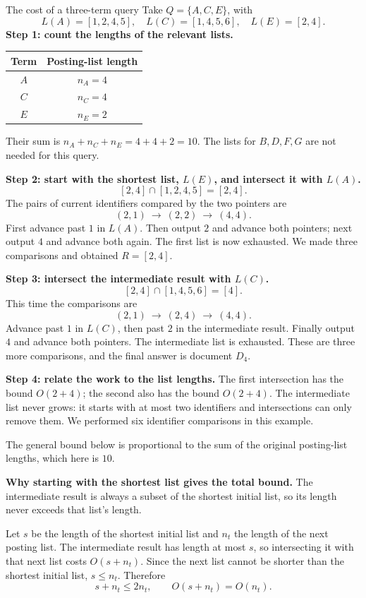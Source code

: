 \documentclass[a4paper,12pt,oneside]{report}
\begin{document}
\begin{framedexample}{The cost of a three-term query}
Take $Q=\{A,C,E\}$, with
\[
  L(A)=[1,2,4,5],\quad L(C)=[1,4,5,6],\quad L(E)=[2,4].
\]
\textbf{Step 1: count the lengths of the relevant lists.}
\begin{center}
\begin{tabular}{c|c}
  Term & Posting-list length\\\hline
  $A$ & $n_A=4$\\
  $C$ & $n_C=4$\\
  $E$ & $n_E=2$
\end{tabular}
\end{center}
Their sum is $n_A+n_C+n_E=4+4+2=10$. The lists for $B,D,F,G$ are
not needed for this query.

\textbf{Step 2: start with the shortest list, $L(E)$, and intersect it
with $L(A)$.}
\[
  [2,4]\cap[1,2,4,5]=[2,4].
\]
The pairs of current identifiers compared by the two pointers are
\[
  (2,1)\ \longrightarrow\ (2,2)\ \longrightarrow\ (4,4).
\]
First advance past $1$ in $L(A)$. Then output $2$ and advance both
pointers; next output $4$ and advance both again. The first list is
now exhausted. We made three comparisons and obtained $R=[2,4]$.

\textbf{Step 3: intersect the intermediate result with $L(C)$.}
\[
  [2,4]\cap[1,4,5,6]=[4].
\]
This time the comparisons are
\[
  (2,1)\ \longrightarrow\ (2,4)\ \longrightarrow\ (4,4).
\]
Advance past $1$ in $L(C)$, then past $2$ in the intermediate
result. Finally output $4$ and advance both pointers. The intermediate
list is exhausted. These are three more comparisons, and the final
answer is document $D_4$.

\textbf{Step 4: relate the work to the list lengths.}
The first intersection has the bound $O(2+4)$; the second also has
the bound $O(2+4)$. The intermediate list never grows: it starts with
at most two identifiers and intersections can only remove them.
We performed six identifier comparisons in this example.

The general bound below is proportional to the sum of the original
posting-list lengths, which here is $10$.
\end{framedexample}

\textbf{Why starting with the shortest list gives the total bound.}
The intermediate result is always a subset of the shortest initial
list, so its length never exceeds that list's length.

Let $s$ be the length of the shortest initial list and $n_t$ the
length of the next posting list. The intermediate result has length
at most $s$, so intersecting it with that next list costs $O(s+n_t)$.
Since the next list cannot be shorter than the shortest initial list,
$s\leq n_t$. Therefore
\[
  s+n_t\leq2n_t,\qquad O(s+n_t)=O(n_t).
\]
\end{document}
